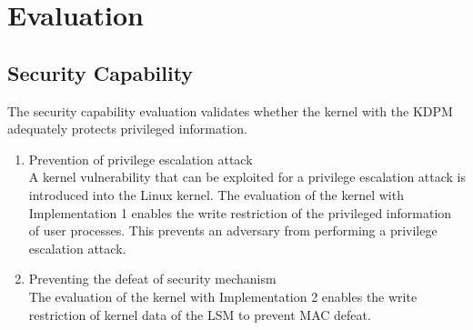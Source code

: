\section{Evaluation} \label{seciton:evaluation}
\subsection{Security Capability}

The security capability evaluation validates whether the kernel with the
KDPM adequately protects privileged information.

\begin{enumerate}%

\item Prevention of privilege escalation attack\\
%
%
A kernel vulnerability that can be exploited for a privilege escalation attack is
introduced into the Linux kernel.
%
The evaluation of the kernel with Implementation 1 enables the write
restriction of the privileged information of user processes. This prevents an
adversary from performing a privilege escalation attack.

\item Preventing the defeat of security mechanism\\
The evaluation of the kernel with Implementation 2 enables the write
restriction of kernel data of the LSM to prevent MAC defeat.%


\end{enumerate}


